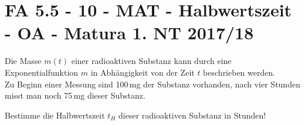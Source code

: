 \section{FA 5.5 - 10 - MAT - Halbwertszeit - OA - Matura 1. NT 2017/18}

\begin{beispiel}[FA 5.5]{1}
Die Masse $m(t)$ einer radioaktiven Substanz kann durch eine Exponentialfunktion $m$ in Abhängigkeit von der Zeit $t$ beschrieben werden.\\
Zu Beginn einer Messung sind 100\,mg der Substanz vorhanden, nach vier Stunden misst man noch 75\,mg dieser Substanz.

Bestimme die Halbwertszeit $t_H$ dieser radioaktiven Substanz in Stunden!

\end{beispiel}